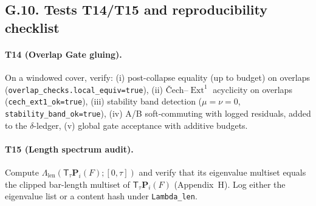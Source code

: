 \documentclass[11pt]{article}
\numberwithin{equation}{section}
\theoremstyle{plain}
\theoremstyle{definition}
\theoremstyle{remark}
\DeclareMathOperator{\Ext}{Ext}
\newcommand{\T}{\mathsf{T}}
\theoremstyle{plain}
\theoremstyle{definition}
\numberwithin{equation}{section}
\theoremstyle{definition}
\numberwithin{equation}{section}
\theoremstyle{plain}
\theoremstyle{definition}
\theoremstyle{remark}
\newcommand{\Pfun}{\mathbf{P}}
\begin{document}
\subsection*{G.10. Tests T14/T15 and reproducibility checklist}
\paragraph{T14 (Overlap Gate gluing).}
On a windowed cover, verify:
(i) post-collapse equality (up to budget) on overlaps (\texttt{overlap\_checks.local\_equiv=true}),
(ii) Čech–\(\Ext^1\) acyclicity on overlaps (\texttt{cech\_ext1\_ok=true}),
(iii) stability band detection (\(\mu=\nu=0\), \texttt{stability\_band\_ok=true}),
(iv) A/B soft-commuting with logged residuals, added to the \(\delta\)-ledger,
(v) global gate acceptance with additive budgets.

\paragraph{T15 (Length spectrum audit).}
Compute \(\Lambda_{\mathrm{len}}(\T_\tau \Pfun_i(F);[0,\tau])\) and verify that its eigenvalue multiset equals the clipped bar-length multiset of \(\T_\tau \Pfun_i(F)\) (Appendix~H). Log either the eigenvalue list or a content hash under \texttt{Lambda\_len}.
\end{document}
